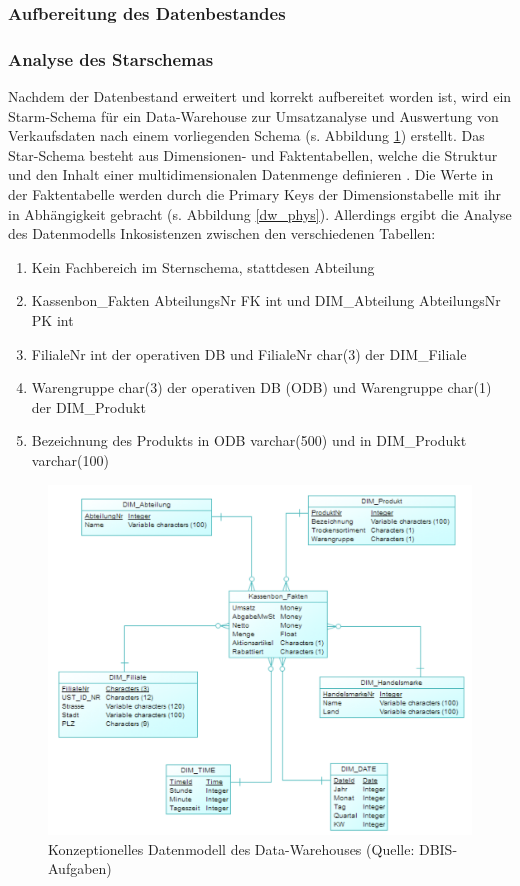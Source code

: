 \subsubsection{Aufbereitung des Datenbestandes}

\subsubsection{Analyse des Starschemas}

Nachdem der Datenbestand erweitert und korrekt aufbereitet worden ist, wird ein Starm-Schema für ein Data-Warehouse zur Umsatzanalyse und Auswertung von Verkaufsdaten nach einem vorliegenden Schema (s. Abbildung \ref{dw_concept}) erstellt. Das Star-Schema besteht aus Dimensionen- und Faktentabellen, welche die Struktur und den Inhalt einer multidimensionalen Datenmenge definieren \citep{Wulff2019}. Die Werte in der Faktentabelle werden durch die Primary Keys der Dimensionstabelle mit ihr in Abhängigkeit gebracht (s. Abbildung \ref{dw_phys}). Allerdings ergibt die Analyse des Datenmodells Inkosistenzen zwischen den verschiedenen Tabellen:

\begin{enumerate}
  \item Kein Fachbereich im Sternschema, stattdesen Abteilung
  \item Kassenbon\_Fakten AbteilungsNr FK int und DIM\_Abteilung AbteilungsNr PK int
  \item FilialeNr int der operativen DB und FilialeNr char(3) der DIM\_Filiale
  \item Warengruppe char(3) der operativen DB (ODB) und Warengruppe char(1) der DIM\_Produkt
  \item Bezeichnung des Produkts in ODB varchar(500) und in DIM\_Produkt varchar(100)
\end{enumerate}


\begin{figure}[ht!]
  \centering
  \includegraphics[width=1.1\linewidth]{pictures/dw_concept.png}
  \caption[Konzeptionelles Datenmodell des Data-Warehouses]{Konzeptionelles Datenmodell des Data-Warehouses (Quelle: DBIS-Aufgaben)}
  \label{dw_concept}
\end{figure}

